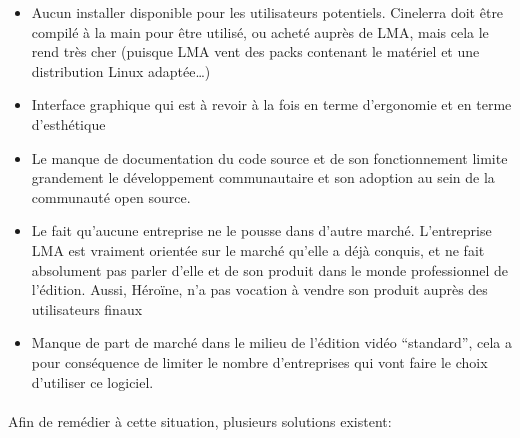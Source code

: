 \begin{itemize}

  \item {Aucun installer disponible pour les utilisateurs
  potentiels. Cinelerra doit être
    compilé à la main pour être utilisé, ou acheté auprès de LMA,
    mais cela le rend très cher (puisque LMA vent des packs contenant
    le matériel et une distribution Linux adaptée\ldots)}

  \item {Interface graphique qui est à revoir à la fois en terme
    d'ergonomie et en terme d'esthétique}

  \item {Le manque de documentation du code source et de son
  fonctionnement
    limite grandement le développement communautaire et son adoption
    au sein de la communauté open source.}

  \item {Le fait qu'aucune entreprise ne le pousse dans d'autre marché.
    L'entreprise LMA est vraiment orientée sur le marché qu'elle a
    déjà conquis, et ne fait absolument pas parler d'elle et de son
    produit dans le monde professionnel de l'édition. Aussi, Héroïne,
    n'a pas vocation à vendre son produit auprès des utilisateurs
    finaux}

  \item {Manque de part de marché dans le milieu de l'édition vidéo
    ``standard'', cela a pour conséquence de limiter le nombre
    d'entreprises qui vont faire le choix d'utiliser ce logiciel.}

\end{itemize}

\paragraph{}

Afin de remédier à cette situation, plusieurs solutions existent:

